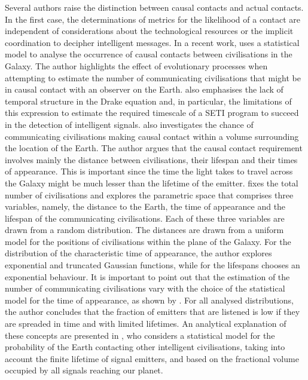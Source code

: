\documentclass[crop]{CSLB}
\begin{document}
Several authors raise the distinction between causal contacts and
actual contacts.
%
In the first case, the determinations of metrics for the likelihood of
a contact are independent of considerations about the technological
resources or the implicit coordination to decipher intelligent
messages.
%
In a recent work, \citet{balbi_impact_2018} uses a statistical model to
analyse the occurrence of causal contacts between civilisations in the
Galaxy.
%
The author highlights the effect of evolutionary processes when
attempting to estimate the number of communicating civilisations that
might be in causal contact with an observer on the Earth.
%
\citet{cirkovic_temporal_2004} also emphasises the lack of temporal
structure in the Drake equation and, in particular, the limitations
of this expression to estimate the required timescale of a SETI
program to succeed in the detection of intelligent signals.
% 
\citet{balbi_impact_2018} also investigates the chance of
communicating civilisations making causal contact within a volume
surrounding the location of the Earth.
%
The author argues that the causal contact requirement involves mainly
the distance between civilisations, their lifespan and their times of
appearance.
%
This is important since the time the light takes to travel across the
Galaxy might be much lesser than the lifetime of the emitter.
%
\citet{balbi_impact_2018} fixes the total number of civilisations and
explores the parametric space that comprises three variables, namely,
the distance to the Earth, the time of appearance and the lifespan of
the communicating civilisations.
%
Each of these three variables are drawn from a random distribution.
%
The distances are drawn from a uniform model 
for the
positions of civilisations within the plane of the Galaxy.
%
For the distribution of the characteristic time of appearance, the
author explores exponential and truncated Gaussian functions,
while for the lifespans chooses an exponential behaviour.
%
It is important to point out that the estimation of the number of
communicating civilisations vary with the choice of the statistical
model for the time of appearance, as shown by
\citet{balbi_impact_2018}.
%
For all analysed distributions, the author concludes that the
fraction of emitters that are listened is low if they are spreaded in
time and with limited lifetimes.
%
An analytical explanation of these concepts are presented 
in \citet{grimaldi_signal_2017}, who considers a statistical model for the
probability of the Earth contacting other intelligent civilisations,
taking into account the finite lifetime of signal emitters, and based
on the fractional volume occupied by all signals reaching our planet.
\end{document}
